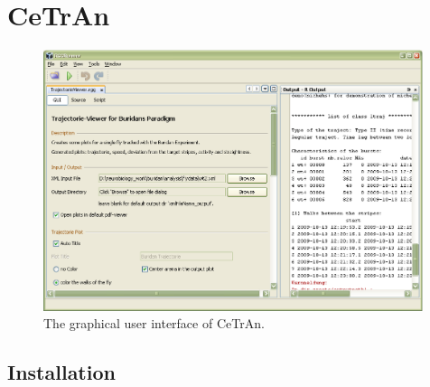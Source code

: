 \documentclass[11pt,a4paper]{article}
\begin{document}
\newpage
\section{CeTrAn}

\begin{figure}[h]
    	\mbox{\includegraphics[width=0.99\textwidth]{figures/analysis_trajviewer.eps}}
 	\caption{The graphical user interface of CeTrAn.}
  	\label{fig:CeTrAn}
 \end{figure}

\subsection{Installation}
\end{document}
